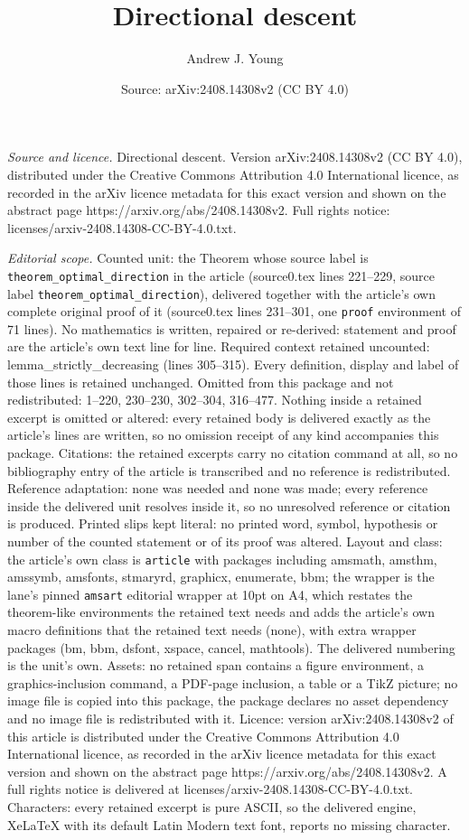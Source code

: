 \documentclass[10pt,a4paper]{amsart}
\title[Directional descent]{Directional descent}
\author{Andrew J. Young}
\date{Source: arXiv:2408.14308v2 (CC BY 4.0)}
\begin{document}
\maketitle

\noindent\emph{Source and licence.} Directional descent. Version arXiv:2408.14308v2 (CC BY 4.0), distributed under the Creative Commons Attribution 4.0 International licence, as recorded in the arXiv licence metadata for this exact version and shown on the abstract page https://arxiv.org/abs/2408.14308v2. Full rights notice: licenses/arxiv-2408.14308-CC-BY-4.0.txt.\par\smallskip

\noindent\textit{Editorial scope.} Counted unit: the Theorem whose source label is \texttt{theorem\_optimal\_direction} in the article (source0.tex lines 221--229, source label \texttt{theorem\_optimal\_direction}), delivered together with the article's own complete original proof of it (source0.tex lines 231--301, one \texttt{proof} environment of 71 lines). No mathematics is written, repaired or re-derived: statement and proof are the article's own text line for line. Required context retained uncounted: lemma\_strictly\_decreasing (lines 305--315). Every definition, display and label of those lines is retained unchanged. Omitted from this package and not redistributed: 1--220, 230--230, 302--304, 316--477. Nothing inside a retained excerpt is omitted or altered: every retained body is delivered exactly as the article's lines are written, so no omission receipt of any kind accompanies this package. Citations: the retained excerpts carry no citation command at all, so no bibliography entry of the article is transcribed and no reference is redistributed. Reference adaptation: none was needed and none was made; every reference inside the delivered unit resolves inside it, so no unresolved reference or citation is produced. Printed slips kept literal: no printed word, symbol, hypothesis or number of the counted statement or of its proof was altered. Layout and class: the article's own class is \texttt{article} with packages including amsmath, amsthm, amssymb, amsfonts, stmaryrd, graphicx, enumerate, bbm; the wrapper is the lane's pinned \texttt{amsart} editorial wrapper at 10pt on A4, which restates the theorem-like environments the retained text needs and adds the article's own macro definitions that the retained text needs (none), with extra wrapper packages (bm, bbm, dsfont, xspace, cancel, mathtools). The delivered numbering is the unit's own. Assets: no retained span contains a figure environment, a graphics-inclusion command, a PDF-page inclusion, a table or a TikZ picture; no image file is copied into this package, the package declares no asset dependency and no image file is redistributed with it. Licence: version arXiv:2408.14308v2 of this article is distributed under the Creative Commons Attribution 4.0 International licence, as recorded in the arXiv licence metadata for this exact version and shown on the abstract page https://arxiv.org/abs/2408.14308v2. A full rights notice is delivered at licenses/arxiv-2408.14308-CC-BY-4.0.txt. Characters: every retained excerpt is pure ASCII, so the delivered engine, XeLaTeX with its default Latin Modern text font, reports no missing character.
\end{document}
